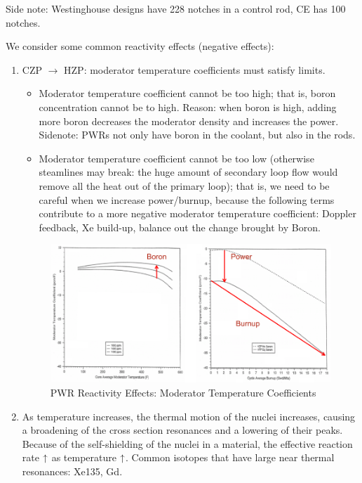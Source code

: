 \documentclass{school-22.211-notes}
\begin{document}
Side note: Westinghouse designs have 228 notches in a control rod, CE has 100 notches. 



\clearpage
{}
We consider some common reactivity effects (negative effects): 
\begin{enumerate}
\item CZP $\to$ HZP: moderator temperature coefficients must satisfy limits.
  \begin{itemize}
  \item Moderator temperature coefficient cannot be too high; that is, boron concentration cannot be to high. Reason: when boron is high, adding more boron decreases the moderator density and increases the power. Sidenote: PWRs not only have boron in the coolant, but also in the rods.
  \item Moderator temperature coefficient cannot be too low (otherwise steamlines may break: the huge amount of secondary loop flow would remove all the heat out of the primary loop); that is, we need to be careful when we increase power/burnup, because the following terms contribute to a more negative moderator temperature coefficient: Doppler feedback, Xe build-up, balance out the change brought by Boron. 
  \end{itemize}
  \begin{figure}[ht]
    \centering
    \includegraphics[width=6.5in]{images/design/moderator-temp-coeff.png}
    \caption{PWR Reactivity Effects: Moderator Temperature Coefficients} \label{PWR-rho}
  \end{figure}

\item {} As temperature increases, the thermal motion of the nuclei increases, causing a broadening of the cross section resonances and a lowering of their peaks. Because of the self-shielding of the nuclei in a material, the effective reaction rate $\uparrow$ as temperature $\uparrow$. Common isotopes that have large near thermal resonances: Xe135, Gd. 


\end{enumerate}
\end{document}
